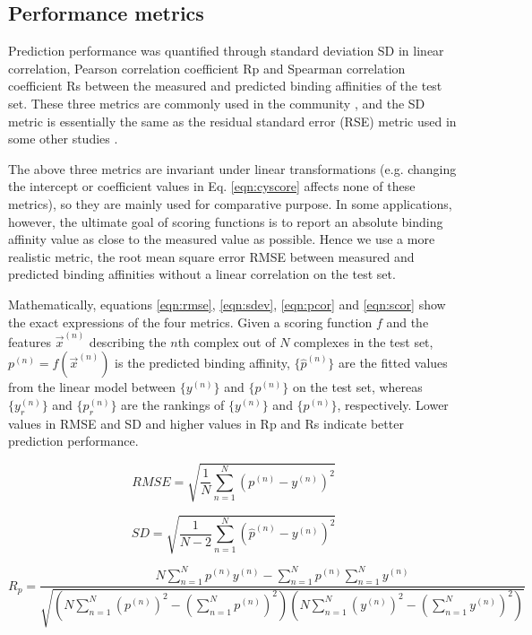 \documentclass[journal=jacsat,manuscript=article]{achemso}
\begin{document}
\subsection{Performance metrics}

Prediction performance was quantified through standard deviation SD in linear correlation, Pearson correlation coefficient Rp and Spearman correlation coefficient Rs between the measured and predicted binding affinities of the test set. These three metrics are commonly used in the community \cite{1313}, and the SD metric is essentially the same as the residual standard error (RSE) metric used in some other studies \cite{963}.

The above three metrics are invariant under linear transformations (e.g. changing the intercept or coefficient values in Eq. \ref{eqn:cyscore} affects none of these metrics), so they are mainly used for comparative purpose. In some applications, however, the ultimate goal of scoring functions is to report an absolute binding affinity value as close to the measured value as possible. Hence we use a more realistic metric, the root mean square error RMSE between measured and predicted binding affinities without a linear correlation on the test set.

Mathematically, equations \ref{eqn:rmse}, \ref{eqn:sdev}, \ref{eqn:pcor} and \ref{eqn:scor} show the exact expressions of the four metrics. Given a scoring function $f$ and the features $\overrightarrow{x}^{(n)}$ describing the $n$th complex out of $N$ complexes in the test set, $p^{(n)}=f(\overrightarrow{x}^{(n)})$ is the predicted binding affinity, $\{\hat{p}^{(n)}\}$ are the fitted values from the linear model between $\{y^{(n)}\}$ and $\{p^{(n)}\}$ on the test set, whereas $\{y_r^{(n)}\}$ and $\{p_r^{(n)}\}$ are the rankings of $\{y^{(n)}\}$ and $\{p^{(n)}\}$, respectively. Lower values in RMSE and SD and higher values in Rp and Rs indicate better prediction performance.

\begin{equation}
RMSE = \sqrt{\frac{1}{N}\sum_{n=1}^N(p^{(n)}-y^{(n)})^2}
\label{eqn:rmse}
\end{equation}

\begin{equation}
SD = \sqrt{\frac{1}{N-2}\sum_{n=1}^N(\hat{p}^{(n)}-y^{(n)})^2}
\label{eqn:sdev}
\end{equation}

\begin{equation}
R_p = \frac{N\sum_{n=1}^Np^{(n)}y^{(n)}-\sum_{n=1}^Np^{(n)}\sum_{n=1}^Ny^{(n)}}{\sqrt{(N\sum_{n=1}^N(p^{(n)})^2-(\sum_{n=1}^Np^{(n)})^2)(N\sum_{n=1}^N(y^{(n)})^2-(\sum_{n=1}^Ny^{(n)})^2)}}
\label{eqn:pcor}
\end{equation}
\end{document}
